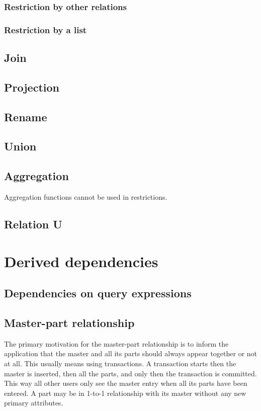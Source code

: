\documentclass[letter,10pt]{article}
\begin{document}
\subsubsection{Restriction by other relations}
\subsubsection{Restriction by a list}

\subsection{Join}
\subsection{Projection}
\subsection{Rename}
\subsection{Union}
\subsection{Aggregation}
Aggregation functions cannot be used in restrictions. 
\subsection{Relation U}

\section{Derived dependencies}\label{sec:def2}
\subsection{Dependencies on query expressions}
\subsection{Master-part relationship}
The primary motivation for the master-part relationship is to inform the application that the master and all its parts should always appear together or not at all.  
This usually means using transactions.  
A transaction starts then the master is inserted, then all the parts, and only then the transaction is committed.  
This way all other users only see the master entry when all its parts have been entered.
A part may be in 1-to-1 relationship with its master without any new primary attributes.
\end{document}
